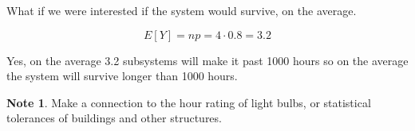 \documentclass[11pt]{article}
\theoremstyle{definition}
\newtheorem{note}{Note}
\begin{document}
\noindent What if we were interested if the system would survive, on the average.

$$
	E[Y] = np = 4 \cdot 0.8 = 3.2
$$

\noindent Yes, on the average 3.2 subsystems will make it past 1000 hours so on the average the system will survive longer than 1000 hours.

\begin{note}
	Make a connection to the hour rating of light bulbs, or statistical tolerances of buildings and other structures.
\end{note}
\end{document}
